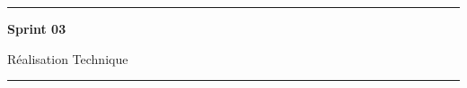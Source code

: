 \newpage
\thispagestyle{empty}
\vspace*{\fill}
\begin{center}
\rule{0.8\textwidth}{0.5pt}

\vspace{1cm}
{\Huge\bfseries Sprint 03}

\vspace{0.5cm}
{\LARGE Réalisation Technique}
\vspace{1cm}

\rule{0.8\textwidth}{0.5pt}
\end{center}
\vspace*{\fill}
\newpage
